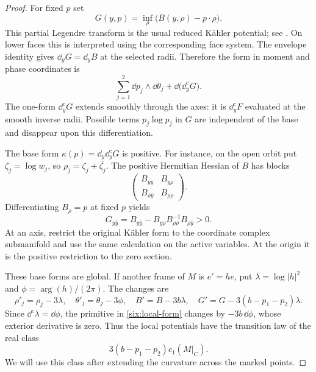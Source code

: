 \begin{proof}
For fixed \(p\) set
\begin{equation}\label{six:legendre}
 G(y,p)=\inf_\rho\bigl(B(y,\rho)-p\cdot\rho\bigr).
\end{equation}
This partial Legendre transform is the usual reduced K\"ahler potential;
see \cite[Sections~4--5]{BurnsGuillemin2004}.
On lower faces this is interpreted using the corresponding
face system.  The envelope identity gives
\(\dd_yG=\dd_yB\) at the selected radii.  Therefore the form
in moment and phase coordinates is
\begin{equation}\label{six:local-form}
 \sum_{j=1}^2\dd p_j\wedge\dd\theta_j
       +\dd\bigl(\dd_y^cG\bigr).
\end{equation}
The one-form \(\dd_y^cG\) extends smoothly through the axes:
it is \(\dd_y^cF\) evaluated at the smooth inverse radii.
Possible terms \(p_j\log p_j\) in \(G\) are independent of the
base and disappear upon this differentiation.

The base form \(\kappa(p)=\dd_y\dd_y^cG\) is positive.
For instance, on the open orbit put \(\zeta_j=\log w_j\),
so \(\rho_j=\zeta_j+\overline{\zeta_j}\).
The positive Hermitian Hessian of \(B\) has blocks
\[
 \begin{pmatrix}
 B_{y\bar y}&B_{y\rho}\\
 B_{\rho\bar y}&B_{\rho\rho}
 \end{pmatrix}.
\]
Differentiating \(B_\rho=p\) at fixed \(p\) yields
\[
 G_{y\bar y}=
 B_{y\bar y}-B_{y\rho}B_{\rho\rho}^{-1}B_{\rho\bar y}>0.
\]
At an axis, restrict the original Kähler form to the coordinate
complex submanifold and use the same calculation on the active
variables.  At the origin it is the positive restriction to
the zero section.

These base forms are global.  If another frame of \(M\) is
\(e'=he\), put \(\lambda=\log|h|^2\) and
\(\phi=\arg(h)/(2\pi)\).  The changes are
\[
 \rho'_j=\rho_j-3\lambda,\quad
 \theta'_j=\theta_j-3\phi,\quad
 B'=B-3b\lambda,\quad
 G'=G-3(b-p_1-p_2)\lambda.
\]
Since \(\dd^c\lambda=\dd\phi\), the primitive in
\eqref{six:local-form} changes by \(-3b\,\dd\phi\), whose
exterior derivative is zero.
Thus the local potentials have the transition law of the real class
\begin{equation}\label{six:curvature-class}
 3(b-p_1-p_2)c_1(M|_C).
\end{equation}
We will use this class after extending the curvature across the marked
points.


\end{proof}
